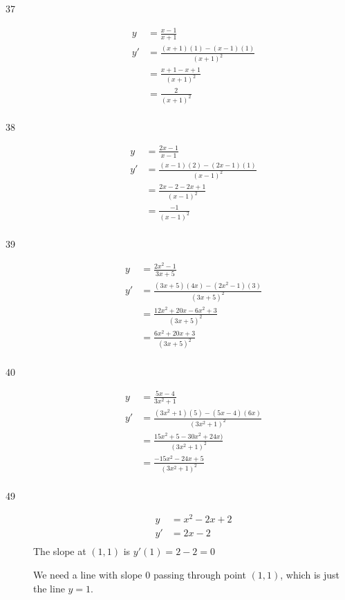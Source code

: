 \documentclass{exam}
\begin{document}
\begin{description}
\item[37]
\begin{align*}
  y  &= \frac{x-1}{x+1} \\
  y' &= \frac{(x+1)(1) - (x-1)(1)}{(x + 1)^2} \\
     &= \frac{x+1 - x + 1}{(x+1)^2} \\
     &= \frac{2}{(x+1)^2} \\
\end{align*}

\item[38]
\begin{align*}
  y  &= \frac{2x-1}{x-1} \\
  y' &= \frac{(x-1)(2) - (2x-1)(1)}{(x - 1)^2} \\
     &= \frac{2x - 2 - 2x + 1}{(x-1)^2} \\
     &= \frac{-1}{(x-1)^2} \\
\end{align*}

\item[39]
\begin{align*}
  y  &= \frac{2x^2 - 1}{3x + 5} \\
  y' &= \frac{(3x + 5)(4x) - (2x^2 - 1)(3)}{(3x + 5)^2} \\
     &= \frac{12x^2 + 20x - 6x^2 +3}{(3x + 5)^2} \\
     &= \frac{6x^2 + 20x +3}{(3x + 5)^2} \\
\end{align*}

\item[40]
\begin{align*}
  y  &= \frac{5x - 4}{3x^2 + 1} \\
  y' &= \frac{(3x^2 + 1)(5) - (5x - 4)(6x)}{(3x^2 + 1)^2} \\
     &= \frac{15x^2 + 5 - 30x^2 + 24x)}{(3x^2 + 1)^2} \\
     &= \frac{-15x^2 - 24x + 5}{(3x^2 + 1)^2} \\
\end{align*}

\item[49]
\begin{align*}
  y  &= x^2 - 2x + 2 \\
  y' &= 2x - 2 \\
\end{align*}
The slope at $(1, 1)$ is $y'(1) = 2 - 2 = 0$

We need a line with slope 0 passing through point $(1, 1)$, which is just the line $y = 1$.


\end{description}
\end{document}
